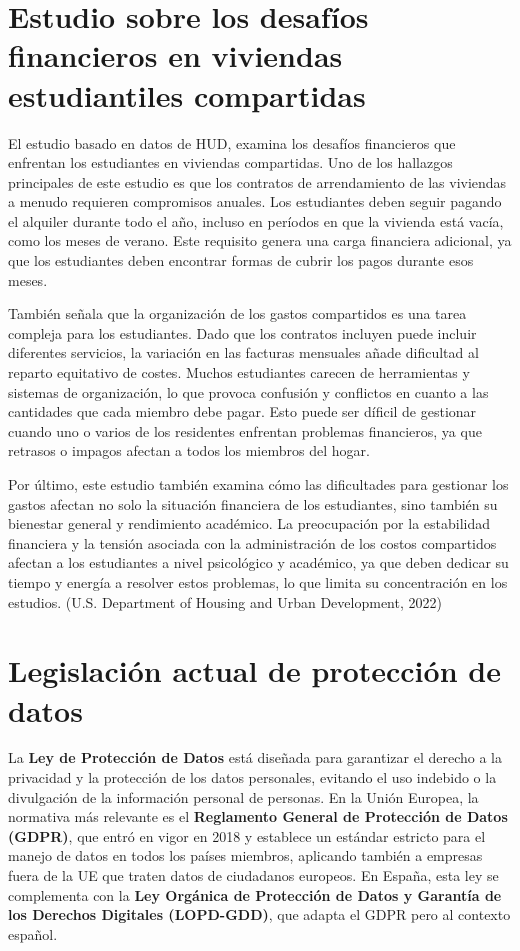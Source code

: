 \section{Estudio sobre los desafíos financieros en viviendas estudiantiles compartidas}
El estudio basado en datos de HUD, examina los desafíos financieros que enfrentan los estudiantes en viviendas compartidas. Uno de los hallazgos
principales de este estudio es que los contratos de arrendamiento de las viviendas a menudo requieren compromisos anuales. Los estudiantes deben 
seguir pagando el alquiler durante todo el año, incluso en períodos en que la vivienda está vacía, como los meses de verano. Este requisito genera una carga
financiera adicional, ya que los estudiantes deben encontrar formas de cubrir los pagos durante esos meses.

También señala que la organización de los gastos compartidos es una tarea compleja para los estudiantes. Dado que los contratos incluyen puede incluir 
diferentes servicios, la variación en las facturas mensuales añade dificultad al reparto equitativo de costes. Muchos estudiantes carecen de herramientas 
y sistemas de organización, lo que provoca confusión y conflictos en cuanto a las cantidades que cada miembro debe pagar. Esto puede ser 
díficil de gestionar cuando uno o varios de los residentes enfrentan problemas financieros, ya que retrasos o impagos afectan a todos los miembros del hogar.

Por último, este estudio también examina cómo las dificultades para gestionar los gastos afectan no solo la situación financiera de los estudiantes, 
sino también su bienestar general y rendimiento académico. La preocupación por la estabilidad financiera y la tensión asociada con la administración de los 
costos compartidos afectan a los estudiantes a nivel psicológico y académico, ya que deben dedicar su tiempo y energía a resolver estos problemas, lo que limita 
su concentración en los estudios. (U.S. Department of Housing and Urban Development, 2022)

\newpage

\section{Legislación actual de protección de datos}

La \textbf{Ley de Protección de Datos} está diseñada para garantizar el derecho a la privacidad y 
la protección de los datos personales, evitando el uso indebido o la divulgación de la información 
personal de personas. En la Unión Europea, la normativa más relevante es el 
\textbf{Reglamento General de Protección de Datos (GDPR)}, que entró en vigor en 2018 y 
establece un estándar estricto para el manejo de datos en todos los países miembros, aplicando también 
a empresas fuera de la UE que traten datos de ciudadanos europeos. En España, esta ley se complementa con 
la \textbf{Ley Orgánica de Protección de Datos y Garantía de los Derechos Digitales (LOPD-GDD)}, que adapta
el GDPR pero al contexto español.

